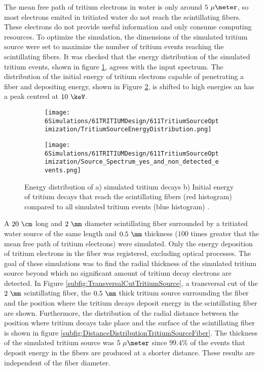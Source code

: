 The mean free path of tritium electrons in water is only around $5~\mu\meter$, so most electrons emited in tritiated water do not reach the scintillating fibers. These electrons do not provide useful information and only consume computing resources. To optimize the simulation, the dimensions of the simulated tritium source were set to maximize the number of tritium events reaching the scintillating fibers. It was checked that the energy distribution of the simulated tritium events, shown in figure \ref{subfig:EnergyDistributionTritiumSource}, agrees with the input spectrum. The distribution of the initial energy of tritium electrons capable of penetrating a fiber and depositing energy, shown in Figure \ref{subfig:EnergySpectrumEventsDetectedandNonDetected}, is shifted to high energies an has a peak centred at $10~\keV$. 

\begin{figure}
\centering
    \begin{subfigure}[b]{0.45\textwidth}
    \centering
    \texttt{[image: 6Simulations/61TRITIUMDesign/611TritiumSourceOptimization/TritiumSourceEnergyDistribution.png]}  
    \caption{\label{subfig:EnergyDistributionTritiumSource}}
    \end{subfigure}
    \hfill
    \begin{subfigure}[b]{0.45\textwidth}
    \centering
    \texttt{[image: 6Simulations/61TRITIUMDesign/611TritiumSourceOptimization/Source\_Spectrum\_yes\_and\_non\_detected\_events.png]}  
    \caption{\label{subfig:EnergySpectrumEventsDetectedandNonDetected}}
    \end{subfigure}
 \caption{Energy distribution of a) simulated tritium decays b) Initial energy of tritium decays that reach the scintillating fibers (red histogram) compared to all simulated tritium events (blue histogram) \cite{SimulationPaperCarlos}.
 \label{fig:TritiumSourceOptimization}}
\end{figure}

A $20~\cm$ long and $2~\mm$ diameter scintillating fiber surrounded by a tritiated water source of the same length and $0.5~\mm$ thickness ($100$ times greater that the mean free path of tritium electrons) were simulated. Only the energy deposition of tritium electrons in the fiber was registered, excluding optical processes. The goal of these simulations was to find the radial thickness of the simulated tritium source beyond which no significant amount of tritium decay electrons are detected. In Figure \ref{subfig:TransversalCutTritiumSource}, a transversal cut of the $2~\mm$ scintillating fiber, the $0.5~\mm$ thick tritium source surrounding the fiber and the position where the tritium decays deposit energy in the scintillating fiber are shown. Furthermore, the distribution of the radial distance between the position where tritium decays take place and the surface of the scintillating fiber is shown in figure \ref{subfig:DistanceDistributionTritiumSourceFiber}. The thickness of the simulated tritium source was $5~\mu\meter$ since $99.4\%$ of the events that deposit energy in the fibers are produced at a shorter distance. These results are independent of the fiber diameter.

